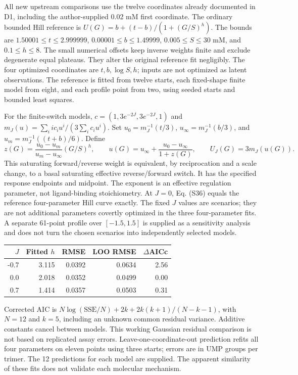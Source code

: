 \documentclass[11pt]{article}
\begin{document}
All new upstream comparisons use the twelve coordinates already documented in D1, including the author-supplied 0.02 mM first coordinate. The ordinary bounded Hill reference is $U(G)=b+(t-b)/(1+(G/S)^h)$. The bounds are $1.50001\le t\le2.999999$, $0.00001\le b\le1.49999$, $0.005\le S\le30$ mM, and $0.1\le h\le8$. The small numerical offsets keep inverse weights finite and exclude degenerate equal plateaus. They alter the original reference fit negligibly. The four optimized coordinates are $t,b,\log S,h$; inputs are not optimized as latent observations. The reference is fitted from twelve starts, each fixed-shape finite model from eight, and each profile point from two, using seeded starts and bounded least squares.

For the finite-switch models, $c=(1,3e^{-2J},3e^{-2J},1)$ and $m_J(u)=\sum_i i c_i u^i/(3\sum_i c_i u^i)$. Set $u_0=m_J^{-1}(t/3)$, $u_\infty=m_J^{-1}(b/3)$, and $u_m=m_J^{-1}((t+b)/6)$. Define
\[
z(G)=\frac{u_0-u_m}{u_m-u_\infty}(G/S)^h,\qquad
u(G)=u_\infty+\frac{u_0-u_\infty}{1+z(G)},\qquad U_J(G)=3m_J(u(G)). \tag{S36}
\]
This saturating forward/reverse weight is equivalent, by reciprocation and a scale change, to a basal saturating effective reverse/forward switch. It has the specified response endpoints and midpoint. The exponent is an effective regulation parameter, not ligand-binding stoichiometry. At $J=0$, Eq. (S36) equals the reference four-parameter Hill curve exactly. The fixed $J$ values are scenarios; they are not additional parameters covertly optimized in the three four-parameter fits. A separate 61-point profile over $[-1.5,1.5]$ is supplied as a sensitivity analysis and does not turn the chosen scenarios into independently selected models.

\begin{center}\begin{tabular}{rrrrr}\toprule $J$ & Fitted $h$ & RMSE & LOO RMSE & $\Delta$AICc \\\midrule
-0.7 & 3.115 & 0.0392 & 0.0634 & 2.56 \\
0.0 & 2.018 & 0.0352 & 0.0499 & 0.00 \\
0.7 & 1.414 & 0.0357 & 0.0503 & 0.31 \\
\bottomrule\end{tabular}\end{center}


Corrected AIC is $N\log(\mathrm{SSE}/N)+2k+2k(k+1)/(N-k-1)$, with $N=12$ and $k=5$, including an unknown common residual variance. Additive constants cancel between models. This working Gaussian residual comparison is not based on replicated assay errors. Leave-one-coordinate-out prediction refits all four parameters on eleven points using three starts; errors are in UMP groups per trimer. The 12 predictions for each model are supplied. The apparent similarity of these fits does not validate each molecular mechanism.
\end{document}
